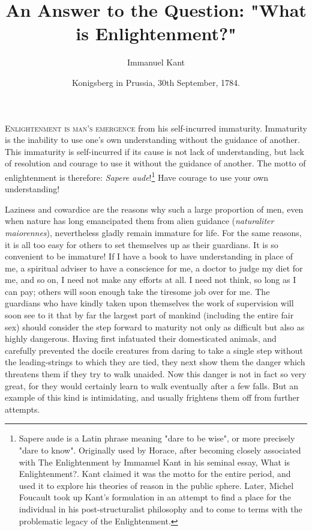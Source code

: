 \documentclass[11pt,twocolumn]{ltugboat}
\title{An Answer to the Question: "What is Enlightenment?"}
\author{Immanuel Kant}
\date{Konigsberg in Prussia, 30th September, 1784.}
\begin{document}
\maketitle



%
%

\lettrine{E}{nlightenment is man's emergence} from his self-incurred immaturity. Immaturity is the inability to use one's own understanding without the guidance of another. This immaturity is self-incurred if its cause is not lack of understanding, but lack of resolution and courage to use it without the guidance of another. The motto of enlightenment is therefore: \textit{Sapere aude}!\footnote{Sapere aude is a Latin phrase meaning "dare to be wise", or more precisely "dare to know". Originally used by Horace, after becoming closely associated with The Enlightenment by Immanuel Kant in his seminal essay, What is Enlightenment?. Kant claimed it was the motto for the entire period, and used it to explore his theories of reason in the public sphere. Later, Michel Foucault took up Kant's formulation in an attempt to find a place for the individual in his post-structuralist philosophy and to come to terms with the problematic legacy of the Enlightenment.} Have courage to use your own understanding!

Laziness and cowardice are the reasons why such a large proportion of men, even when nature has long emancipated them from alien guidance (\textit{naturaliter maiorennes}), nevertheless gladly remain immature for life. For the same reasons, it is all too easy for others to set themselves up as their guardians. It is so convenient to be immature! If I have a book to have understanding in place of me, a spiritual adviser to have a conscience for me, a doctor to judge my diet for me, and so on, I need not make any efforts at all. I need not think, so long as I can pay; others will soon enough take the tiresome job over for me. The guardians who have kindly taken upon themselves the work of supervision will soon see to it that by far the largest part of mankind (including the entire fair sex) should consider the step forward to maturity not only as difficult but also as highly dangerous. Having first infatuated their domesticated animals, and carefully prevented the docile creatures from daring to take a single step without the leading-strings to which they are tied, they next show them the danger which threatens them if they try to walk unaided. Now this danger is not in fact so very great, for they would certainly learn to walk eventually after a few falls. But an example of this kind is intimidating, and usually frightens them off from further attempts.
\end{document}
